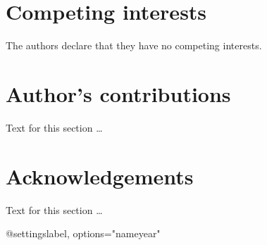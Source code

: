 \documentclass{bmcart}
\begin{document}
\begin{backmatter}

\section*{Competing interests}
  The authors declare that they have no competing interests.

\section*{Author's contributions}
    Text for this section \ldots

\section*{Acknowledgements}
  Text for this section \ldots

 @settings{label, options="nameyear"}




\end{backmatter}
\end{document}
